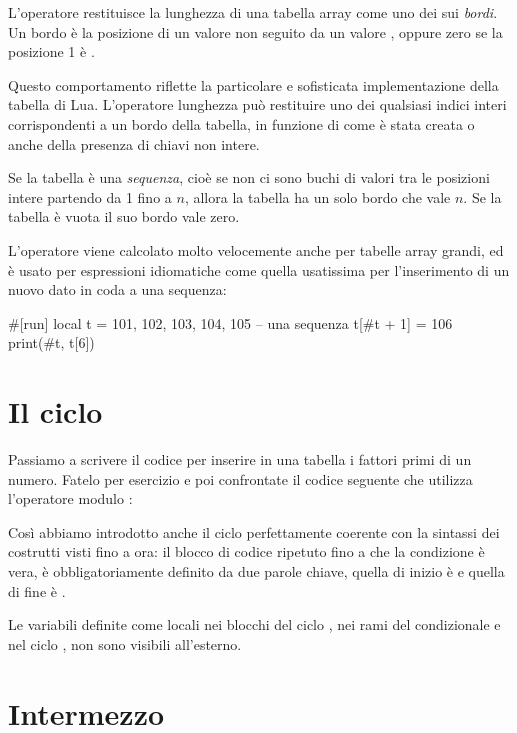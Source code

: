 L'operatore \key{\#} restituisce la lunghezza di una tabella array come uno dei
sui \emph{bordi}. Un bordo è la posizione di un valore non  seguito da
un valore , oppure zero se la posizione 1 è .

Questo comportamento riflette la particolare e sofisticata implementazione della
tabella di Lua. L'operatore lunghezza \key{\#} può restituire uno dei
qualsiasi indici interi corrispondenti a un bordo della tabella, in funzione di
come è stata creata o anche della presenza di chiavi non intere.

Se la tabella è una \emph{sequenza}, cioè se non ci sono buchi di valori tra le
posizioni intere partendo da 1 fino a \( n \), allora la tabella ha un solo
bordo che vale \( n \). Se la tabella è vuota il suo bordo vale zero.

L'operatore \key{\#} viene calcolato molto velocemente anche per tabelle array
grandi, ed è usato per espressioni idiomatiche come quella usatissima per
l'inserimento di un nuovo dato in coda a una sequenza:
\begin{lines}
#[run]
local t = {101, 102, 103, 104, 105} -- una sequenza
t[#t + 1] = 106
print(#t, t[6])
\end{lines}


\section{Il ciclo }
\label{iiSecCicloWhile}

Passiamo a scrivere il codice per inserire in una tabella i fattori primi di un
numero. Fatelo per esercizio e poi confrontate il codice seguente che utilizza
l'operatore modulo \key{\%}:

Così abbiamo introdotto anche il ciclo 
perfettamente coerente con la sintassi dei costrutti visti fino a ora: il blocco
di codice ripetuto fino a che la condizione è vera, è obbligatoriamente definito
da due parole chiave, quella di inizio è  e quella di fine è .

Le variabili definite come locali nei blocchi del ciclo , nei rami del
condizionale  e nel ciclo , non sono visibili all'esterno.


\section{Intermezzo}

